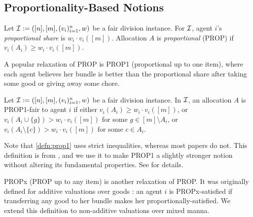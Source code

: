 \subsection{Proportionality-Based Notions}

\begin{definition}[PROP]
\label{defn:prop}
Let $\mathcal{I} := ([n],\allowbreak [m],\allowbreak (v_i)_{i=1}^n,\allowbreak w)$ be a fair division instance.
For $\mathcal{I}$, agent $i$'s \emph{proportional share} is $w_i \cdot v_i([m])$.
Allocation $A$ is \emph{proportional} (PROP) if $v_i(A_i) \ge w_i \cdot v_i([m])$.
\end{definition}

A popular relaxation of PROP is PROP1 (proportional up to one item),
where each agent believes her bundle is better than the proportional share
after taking some good or giving away some chore.

\begin{definition}
\label{defn:prop1}
Let $\mathcal{I} := ([n],\allowbreak [m],\allowbreak (v_i)_{i=1}^n,\allowbreak w)$ be a fair division instance.
In $\mathcal{I}$, an allocation $A$ is PROP1-fair to agent $i$ if
either $v_i(A_i) \ge w_i \cdot v_i([m])$,
or $v_i(A_i \cup \{g\}) > w_i \cdot v_i([m])$ for some $g \in [m] \setminus A_i$,
or $v_i(A_i \setminus \{c\}) > w_i \cdot v_i([m])$ for some $c \in A_i$.
\end{definition}

Note that \cref{defn:prop1} uses strict inequalities, whereas most papers do not.
This definition is from \citet{feige2025low}, and we use it to make PROP1
a slightly stronger notion without altering its fundamental properties.
See  for details.

PROPx (PROP up to any item) \citep{aziz2020polynomial,li2022almost} is another relaxation of PROP.
It was originally defined for additive valuations over goods \citep{aziz2020polynomial}:
an agent $i$ is PROPx-satisfied if transferring any good to her bundle makes her proportionally-satisfied.
We extend this definition to non-additive valuations over mixed manna.


